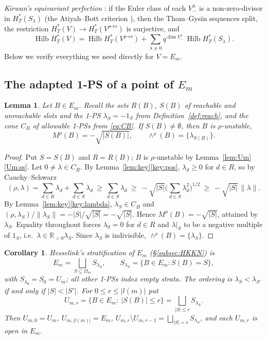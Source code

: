 \documentclass[11pt]{amsart}
\newtheorem{lemma}[theorem]{Lemma}
\newtheorem{corollary}[theorem]{Corollary}
\theoremstyle{definition}
\theoremstyle{remark}
\numberwithin{equation}{section}
\newcommand{\R}{\mathbb{R}}
\newcommand{\Om}{\Omega_m}
\newcommand{\norm}[1]{\lVert #1\rVert}
\DeclareMathOperator{\Hilb}{Hilb}
\begin{document}
\emph{Kirwan's equivariant perfection} \cite{Kir}: if the Euler class of each $V^\lambda_-$ is a
non-zero-divisor in $H^*_T(S_\lambda)$ (the Atiyah--Bott criterion \cite{AB}), then the Thom--Gysin
sequences split, the restriction $H^*_T(V)\to H^*_T(V^{\rho\text{-}ss})$ is surjective, and
\[
  \Hilb H^*_T(V)=\Hilb H^*_T(V^{\rho\text{-}ss})+\sum_{\lambda\neq0}q^{\dim V^\lambda_-}\,
  \Hilb H^*_T(S_\lambda).
\]
Below we verify everything we need directly for $V=E_m$.

\subsection{The adapted 1-PS of a point of \texorpdfstring{$E_m$}{E\_m}}\label{subsec:adapted}

\begin{lemma}\label{lem:index}
Let $B\in E_m$. Recall the sets $R(B)$, $S(B)$ of reachable and unreachable slots and the 1-PS
$\lambda_S=-1_S$ from Definition~\ref{def:reach}, and the cone $C_B$ of allowable 1-PSs from
\eqref{eq:CB}. If $S(B)\neq\emptyset$, then $B$ is $\rho$-unstable,
\[
  M^\rho(B)=-\sqrt{|S(B)|},\qquad \wedge^\rho(B)=\{\lambda_{S(B)}\}.
\]
\end{lemma}

\begin{proof}
Put $S=S(B)$ and $R=R(B)$; $B$ is $\rho$-unstable by Lemma~\ref{lem:Um}\ref{Um:ss}. Let
$0\neq\lambda\in C_B$. By Lemma~\ref{lem:key}\ref{key:pos}, $\lambda_d\ge0$ for $d\in R$, so by
Cauchy--Schwarz
\[
  (\rho,\lambda)=\sum_{d\in R}\lambda_d+\sum_{d\in S}\lambda_d\ \ge\ \sum_{d\in S}\lambda_d
  \ \ge\ -\sqrt{|S|}\Big(\sum_{d\in S}\lambda_d^2\Big)^{1/2}\ \ge\ -\sqrt{|S|}\,\norm{\lambda}.
\]
By Lemma~\ref{lem:key}\ref{key:lambda}, $\lambda_S\in C_B$ and
$(\rho,\lambda_S)/\norm{\lambda_S}=-|S|/\sqrt{|S|}=-\sqrt{|S|}$. Hence $M^\rho(B)=-\sqrt{|S|}$, attained
by $\lambda_S$. Equality throughout forces $\lambda_d=0$ for $d\in R$ and $\lambda|_S$ to be a negative
multiple of $1_S$, i.e.\ $\lambda\in\R_{>0}\lambda_S$. Since $\lambda_S$ is indivisible,
$\wedge^\rho(B)=\{\lambda_S\}$.
\end{proof}

\begin{corollary}\label{cor:strata}
Hesselink's stratification of $E_m$ (\S\ref{subsec:HKKN}) is
\[
  E_m=\bigsqcup_{S\subseteq\Om}S_{\lambda_S},\qquad S_{\lambda_S}=\{B\in E_m: S(B)=S\},
\]
with $S_{\lambda_\emptyset}=S_0=U_m$; all other 1-PSs index empty strata. The ordering is
$\lambda_S<\lambda_{S'}$ if and only if $|S|<|S'|$. For $0\le r\le|l(m)|$ put
\[
  U_{m,r}=\{B\in E_m:\ |S(B)|\le r\}=\bigsqcup_{|S|\le r}S_{\lambda_S}.
\]
Then $U_{m,0}=U_m$, $U_{m,|l(m)|}=E_m$, $U_{m,r}\setminus U_{m,r-1}=\bigsqcup_{|S|=r}S_{\lambda_S}$, and
each $U_{m,r}$ is open in $E_m$.
\end{corollary}
\end{document}
